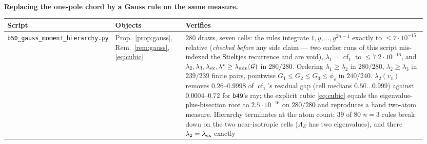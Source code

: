 \documentclass[11pt]{article}
\theoremstyle{remark}
\newcommand{\Gr}{\mathcal{G}}
\newcommand{\Le}{\Lambda_E}
\begin{document}
\noindent\textbf{Replacing the one-pole chord by a Gauss rule on the same measure.}
\begin{center}\footnotesize\begin{tabular}{@{}>{\raggedright\arraybackslash}p{5.1cm}%
>{\raggedright\arraybackslash}p{2.5cm}>{\raggedright\arraybackslash}p{5.8cm}@{}}
\toprule Script & Objects & Verifies\\
\midrule
\texttt{b50\_gauss\_moment\_\allowbreak hierarchy.py} & Prop.~\ref{prop:gauss}, Rem.~\ref{rem:gauss},
\eqref{eq:cubic} & $280$ draws, seven cells: the rules integrate $1,y,\ldots,y^{2n-1}$ exactly to
$\le7\cdot10^{-15}$ relative (\emph{checked before} any side claim --- two earlier runs of this script
mis-indexed the Stieltjes recurrence and are void), $\lambda_1=\operatorname{cf}_1$ to
$\le7.2\cdot10^{-16}$, and $\lambda_2,\lambda_3,\lambda_{\rm ex},\lambda^{\star}\ge
\lambda_{\min}(\Gr)$ in $280/280$. Ordering $\lambda_1\ge\lambda_2$ in $280/280$,
$\lambda_2\ge\lambda_3$ in $239/239$ finite pairs, pointwise $G_1\le G_2\le G_3\le\phi_v$ in
$240/240$. $\lambda_2(v_1)$ removes $0.26$--$0.9998$ of $\operatorname{cf}_1$'s residual gap
(cell medians $0.50\ldots0.999$) against $0.0004$--$0.72$ for \texttt{b49}'s ray; the explicit cubic
\eqref{eq:cubic} equals the eigenvalue-plus-bisection root to $2.5\cdot10^{-16}$ on $280/280$ and
reproduces a hand two-atom measure. Hierarchy terminates at the atom count: $39$ of $80$ $n=3$ rules
break down on the two near-isotropic cells ($\Le$ has two eigenvalues), and there
$\lambda_2=\lambda_{\rm ex}$ exactly\\
\bottomrule
\end{tabular}\end{center}
\end{document}
